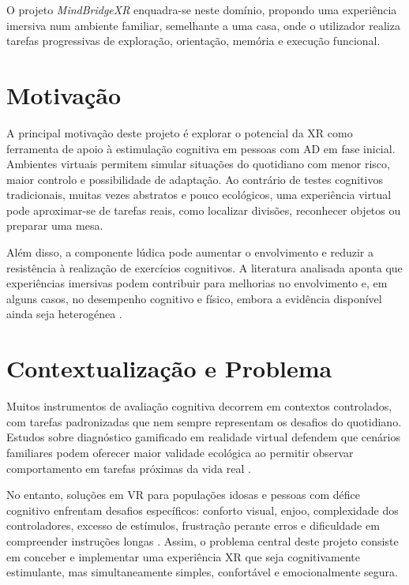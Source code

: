 \documentclass[12pt,a4paper,oneside]{report}
\begin{document}
O projeto \textit{MindBridgeXR} enquadra-se neste domínio, propondo uma experiência imersiva num ambiente familiar, semelhante a uma casa, onde o utilizador realiza tarefas progressivas de exploração, orientação, memória e execução funcional.

\section{Motivação}

A principal motivação deste projeto é explorar o potencial da \ac{XR} como ferramenta de apoio à estimulação cognitiva em pessoas com \ac{AD} em fase inicial. Ambientes virtuais permitem simular situações do quotidiano com menor risco, maior controlo e possibilidade de adaptação. Ao contrário de testes cognitivos tradicionais, muitas vezes abstratos e pouco ecológicos, uma experiência virtual pode aproximar-se de tarefas reais, como localizar divisões, reconhecer objetos ou preparar uma mesa.

Além disso, a componente lúdica pode aumentar o envolvimento e reduzir a resistência à realização de exercícios cognitivos. A literatura analisada aponta que experiências imersivas podem contribuir para melhorias no envolvimento e, em alguns casos, no desempenho cognitivo e físico, embora a evidência disponível ainda seja heterogénea \cite{vasquez2025,yun2020,thapa2020}.

\section{Contextualização e Problema}

Muitos instrumentos de avaliação cognitiva decorrem em contextos controlados, com tarefas padronizadas que nem sempre representam os desafios do quotidiano. Estudos sobre diagnóstico gamificado em realidade virtual defendem que cenários familiares podem oferecer maior validade ecológica ao permitir observar comportamento em tarefas próximas da vida real \cite{xiong2024}.

No entanto, soluções em \ac{VR} para populações idosas e pessoas com défice cognitivo enfrentam desafios específicos: conforto visual, enjoo, complexidade dos controladores, excesso de estímulos, frustração perante erros e dificuldade em compreender instruções longas \cite{tuena2020,yun2020}. Assim, o problema central deste projeto consiste em conceber e implementar uma experiência \ac{XR} que seja cognitivamente estimulante, mas simultaneamente simples, confortável e emocionalmente segura.
\end{document}
